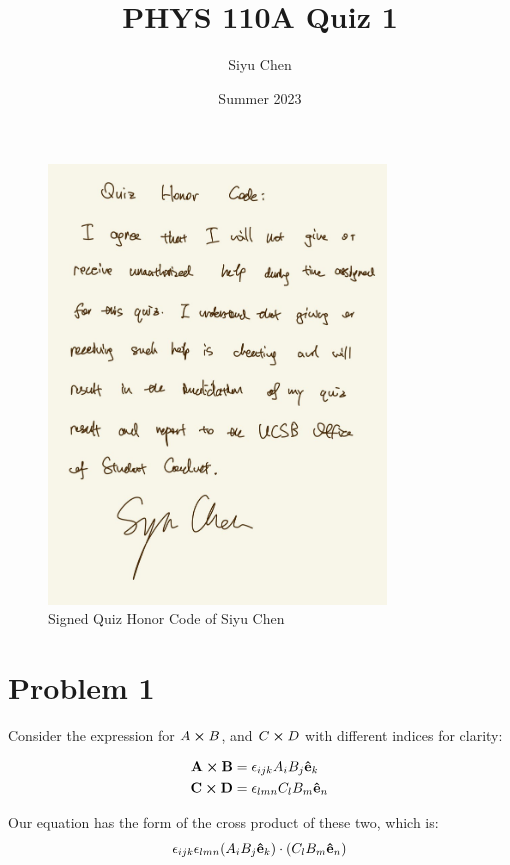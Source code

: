 \documentclass{article}
\title{PHYS 110A Quiz 1}
\author{Siyu Chen}
\date{Summer 2023}
\numberwithin{equation}{section}
\newcommand{\vbh}[1]{\vb{\hat{#1}}}
\begin{document}
\maketitle

\begin{figure}[h]
\centering
\includegraphics[width=0.8\textwidth]{quizzes/quiz honor code.jpg}
\caption{Signed Quiz Honor Code of Siyu Chen}
\end{figure}

\section{Problem 1}

Consider the expression for $A \cross B$, and $C \cross D$ with different indices for clarity:

\begin{equation}
    \begin{split}
        \vb{A} \cross \vb{B} &= \epsilon_{ijk} A_i B_j \vbh{e}_k \\
        \vb{C} \cross \vb{D} &= \epsilon_{lmn} C_l B_m \vbh{e}_n
    \end{split}
\end{equation}

Our equation has the form of the cross product of these two, which is:
\begin{equation}
    \epsilon_{ijk} \epsilon_{lmn} (A_i B_j \vbh{e}_k) \cdot ( C_l B_m \vbh{e}_n)
\end{equation}
\end{document}
